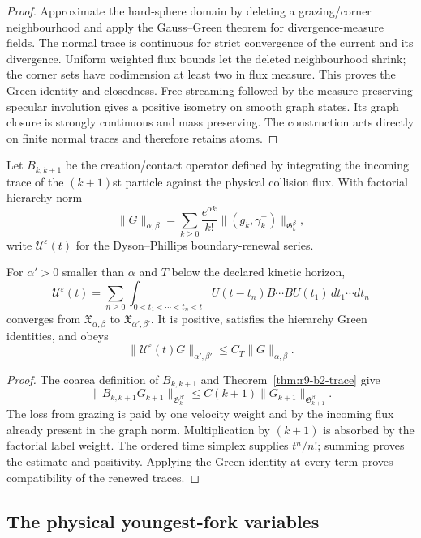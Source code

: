 \begin{proof}
Approximate the hard-sphere domain by deleting a grazing/corner neighbourhood
and apply the Gauss--Green theorem for divergence-measure fields.  The normal
trace is continuous for strict convergence of the current and its divergence.
Uniform weighted flux bounds let the deleted neighbourhood shrink; the corner
sets have codimension at least two in flux measure.  This proves the Green
identity and closedness.  Free streaming followed by the measure-preserving
specular involution gives a positive isometry on smooth graph states.  Its
graph closure is strongly continuous and mass preserving.  The construction
acts directly on finite normal traces and therefore retains atoms.
\end{proof}

Let $B_{k,k+1}$ be the creation/contact operator defined by integrating the
incoming trace of the $(k+1)$st particle against the physical collision flux.
With factorial hierarchy norm
\[
 \|G\|_{\alpha,\beta}
 =\sum_{k\ge0}\frac{e^{\alpha k}}{k!}
  \|(g_k,\gamma_k^-)\|_{\mathfrak G_k^\beta},
\]
write $\mathcal U^\varepsilon(t)$ for the Dyson--Phillips boundary-renewal
series.

\begin{proposition}
\label{prop:r9-b2-renewal}
For $\alpha'>0$ smaller than $\alpha$ and $T$ below the declared kinetic
horizon,
\[
 \mathcal U^\varepsilon(t)
 =\sum_{n\ge0}\int_{0<t_1<\cdots<t_n<t}
 U(t-t_n)B\cdots BU(t_1)\,dt_1\cdots dt_n
\]
converges from $\mathfrak X_{\alpha,\beta}$ to
$\mathfrak X_{\alpha',\beta'}$.  It is positive, satisfies the hierarchy
Green identities, and obeys
\[
 \|\mathcal U^\varepsilon(t)G\|_{\alpha',\beta'}
 \le C_T\|G\|_{\alpha,\beta}.
\]
\end{proposition}

\begin{proof}
The coarea definition of $B_{k,k+1}$ and
Theorem~\ref{thm:r9-b2-trace} give
\[
 \|B_{k,k+1}G_{k+1}\|_{\mathfrak G_k^{\beta'}}
 \le C(k+1)\|G_{k+1}\|_{\mathfrak G_{k+1}^{\beta}}.
\]
The loss from grazing is paid by one velocity weight and by the incoming flux
already present in the graph norm.  Multiplication by $(k+1)$ is absorbed by
the factorial label weight.  The ordered time simplex supplies $t^n/n!$;
summing proves the estimate and positivity.  Applying the Green identity at
every term proves compatibility of the renewed traces.
\end{proof}

\subsection{The physical youngest-fork variables}

